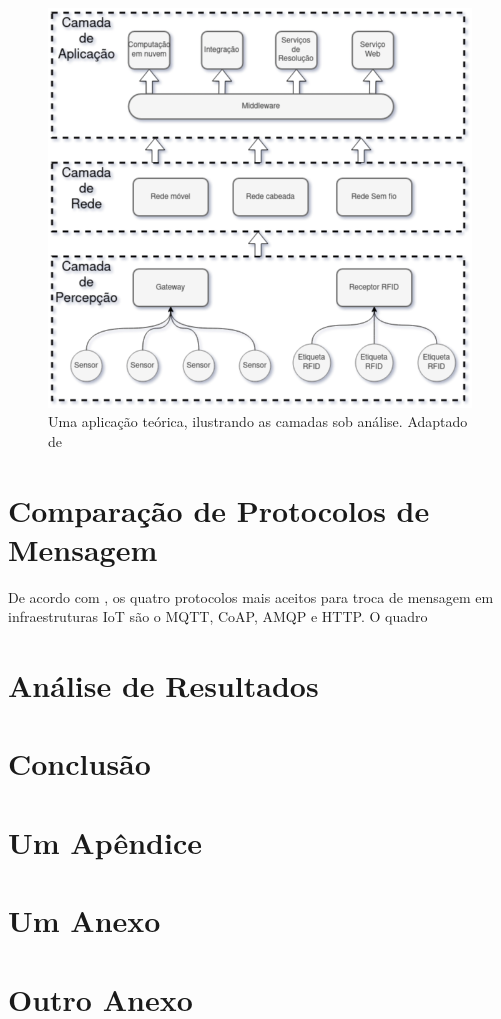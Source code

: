 \documentclass[tcc,capa]{texufpel}
\begin{document}
\begin{figure}[h]
    \centering
    \includegraphics[scale=0.6]{camadas.png}
    \caption{Uma aplicação teórica, ilustrando as camadas sob análise. Adaptado de \cite{schiller}}
    \label{fig:layers}
\end{figure}


\chapter{Comparação de Protocolos de Mensagem}

De acordo com \citet{choice}, os quatro protocolos mais aceitos para troca de mensagem em infraestruturas IoT são o MQTT, CoAP, AMQP e HTTP. O quadro



\chapter{Análise de Resultados}
\chapter{Conclusão}


 

\apendices
\chapter{Um Apêndice}

\anexos
\chapter{Um Anexo}


\chapter{Outro Anexo}
\end{document}
